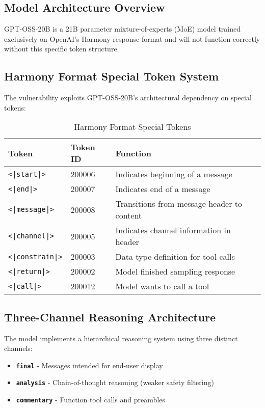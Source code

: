 \documentclass{article}
\begin{document}
\subsection{Model Architecture Overview}

GPT-OSS-20B is a 21B parameter mixture-of-experts (MoE) model trained exclusively on OpenAI's Harmony response format and will not function correctly without this specific token structure.

\subsection{Harmony Format Special Token System}

The vulnerability exploits GPT-OSS-20B's architectural dependency on special tokens:

\begin{table}[h]
\centering
\begin{tabular}{llp{8cm}}
\toprule
\textbf{Token} & \textbf{Token ID} & \textbf{Function} \\
\midrule
\texttt{<|start|>} & 200006 & Indicates beginning of a message \\
\texttt{<|end|>} & 200007 & Indicates end of a message \\
\texttt{<|message|>} & 200008 & Transitions from message header to content \\
\texttt{<|channel|>} & 200005 & Indicates channel information in header \\
\texttt{<|constrain|>} & 200003 & Data type definition for tool calls \\
\texttt{<|return|>} & 200002 & Model finished sampling response \\
\texttt{<|call|>} & 200012 & Model wants to call a tool \\
\bottomrule
\end{tabular}
\caption{Harmony Format Special Tokens}
\end{table}

\subsection{Three-Channel Reasoning Architecture}

The model implements a hierarchical reasoning system using three distinct channels:
\begin{itemize}
    \item \textcolor{bluechannel}{\textbf{\texttt{final}}} - Messages intended for end-user display
    \item \textcolor{redchannel}{\textbf{\texttt{analysis}}} - Chain-of-thought reasoning (weaker safety filtering)
    \item \textcolor{greenchannel}{\textbf{\texttt{commentary}}} - Function tool calls and preambles
\end{itemize}
\end{document}
